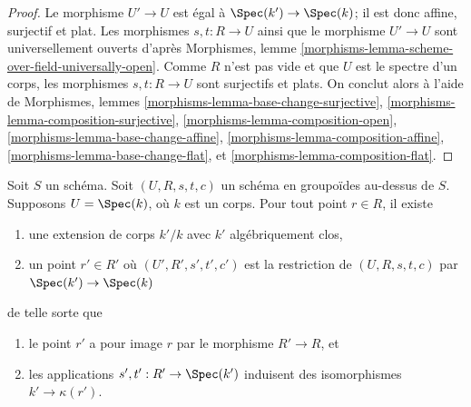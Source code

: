 \begin{proof}
Le morphisme $U' \to U$ est égal à $\Spec(k') \to \Spec(k)$;
il est donc affine, surjectif et plat. Les morphismes $s, t : R \to U$
ainsi que le morphisme $U' \to U$ sont universellement ouverts d'après
Morphismes, lemme \ref{morphisms-lemma-scheme-over-field-universally-open}.
Comme $R$ n'est pas vide et que $U$ est le spectre d'un corps, les morphismes
$s, t : R \to U$ sont surjectifs et plats. On conclut alors à l'aide de
Morphismes, lemmes \ref{morphisms-lemma-base-change-surjective},
\ref{morphisms-lemma-composition-surjective},
\ref{morphisms-lemma-composition-open},
\ref{morphisms-lemma-base-change-affine},
\ref{morphisms-lemma-composition-affine},
\ref{morphisms-lemma-base-change-flat}, et
\ref{morphisms-lemma-composition-flat}.
\end{proof}

\begin{lemma}
\label{lemma-groupoid-on-field-explain-points}
Soit $S$ un schéma. Soit $(U, R, s, t, c)$ un schéma en groupoïdes
au-dessus de $S$. Supposons $U = \Spec(k)$, où $k$ est un corps.
Pour tout point $r \in R$, il existe
\begin{enumerate}
\item une extension de corps $k'/k$ avec $k'$ algébriquement clos,
\item un point $r' \in R'$ où $(U', R', s', t', c')$ est la
restriction de $(U, R, s, t, c)$ par $\Spec(k') \to \Spec(k)$
\end{enumerate}
de telle sorte que
\begin{enumerate}
\item le point $r'$ a pour image $r$ par le morphisme $R' \to R$, et
\item les applications $s', t' : R' \to \Spec(k')$ induisent des isomorphismes
$k' \to \kappa(r')$.
\end{enumerate}
\end{lemma}

